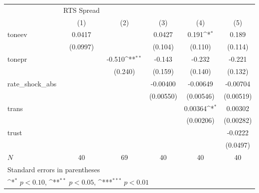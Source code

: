 {
\def\sym#1{\ifmmode^{#1}\else\(^{#1}\)\fi}
\begin{tabular}{l*{5}{c}}
\hline\hline
            &  RTS Spread         &                     &                     &                     &                     \\
            &\multicolumn{1}{c}{(1)}         &\multicolumn{1}{c}{(2)}         &\multicolumn{1}{c}{(3)}         &\multicolumn{1}{c}{(4)}         &\multicolumn{1}{c}{(5)}         \\
\hline
toneev      &      0.0417         &                     &      0.0427         &       0.191\sym{*}  &       0.189         \\
            &    (0.0997)         &                     &     (0.104)         &     (0.110)         &     (0.114)         \\
[1em]
tonepr      &                     &      -0.510\sym{**} &      -0.143         &      -0.232         &      -0.221         \\
            &                     &     (0.240)         &     (0.159)         &     (0.140)         &     (0.132)         \\
[1em]
rate\_shock\_abs&                     &                     &    -0.00400         &    -0.00649         &    -0.00704         \\
            &                     &                     &   (0.00550)         &   (0.00546)         &   (0.00519)         \\
[1em]
trans       &                     &                     &                     &     0.00364\sym{*}  &     0.00302         \\
            &                     &                     &                     &   (0.00206)         &   (0.00282)         \\
[1em]
trust       &                     &                     &                     &                     &     -0.0222         \\
            &                     &                     &                     &                     &    (0.0497)         \\
\hline
\(N\)       &          40         &          69         &          40         &          40         &          40         \\
\hline\hline
\multicolumn{6}{l}{\footnotesize Standard errors in parentheses}\\
\multicolumn{6}{l}{\footnotesize \sym{*} \(p<0.10\), \sym{**} \(p<0.05\), \sym{***} \(p<0.01\)}\\
\end{tabular}
}
